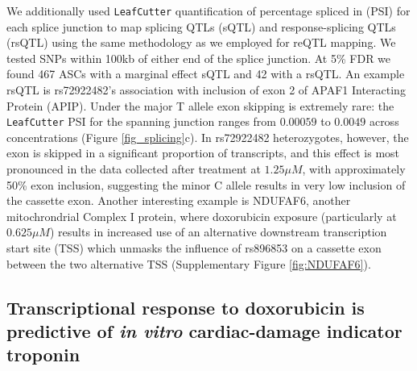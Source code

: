 \documentclass{article}
\begin{document}
We additionally used \texttt{LeafCutter} quantification of percentage spliced in (PSI) for each splice junction to map splicing QTLs (sQTL) and response-splicing QTLs (rsQTL) using the same methodology as we employed for reQTL mapping. We tested SNPs within 100kb of either end of the splice junction. At 5\% FDR we found 467 ASCs with a marginal effect sQTL and 42 with a rsQTL. An example rsQTL is rs72922482's association with inclusion of exon 2 of APAF1 Interacting Protein (APIP). Under the major T allele exon skipping is extremely rare: the \texttt{LeafCutter} PSI for the spanning junction ranges from $0.00059$ to $0.0049$ across concentrations (Figure \ref{fig_splicing}c). In rs72922482 heterozygotes, however, the exon is skipped in a significant proportion of transcripts, and this effect is most pronounced in the data collected after treatment at $1.25 \mu M$, with approximately 50\% exon inclusion, suggesting the minor C allele results in very low inclusion of the cassette exon. Another interesting example is NDUFAF6, another mitochrondrial Complex I protein, where doxorubicin exposure (particularly at $0.625 \mu M$) results in increased use of an alternative downstream transcription start site (TSS) which unmasks the influence of rs896853 on a cassette exon between the two alternative TSS (Supplementary Figure \ref{fig:NDUFAF6}).

\subsection*{Transcriptional response to doxorubicin is predictive of \emph{in vitro} cardiac-damage indicator troponin}
\end{document}
